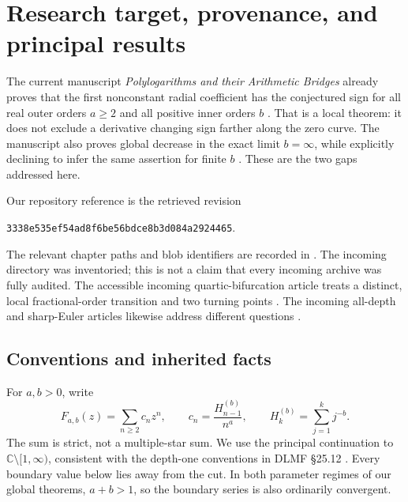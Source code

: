 \documentclass[11pt,letterpaper]{article}
\numberwithin{equation}{section}
\theoremstyle{definition}
\theoremstyle{remark}
\newcommand{\C}{\mathbb C}
\newcommand{\cut}{\C\setminus[1,\infty)}
\begin{document}
\section{Research target, provenance, and principal results}
\label{sec:overview}
The current manuscript \emph{Polylogarithms and their Arithmetic Bridges}
already proves that the first nonconstant radial coefficient has the
conjectured sign for all real outer orders $a\ge2$ and all positive
inner orders $b$ \cite{repo-local}. That is a local theorem: it does not
exclude a derivative changing sign farther along the zero curve.
The manuscript also proves global decrease in the exact limit
$b=\infty$, while explicitly declining to infer the same assertion for
finite $b$ \cite{repo-cartesian}. These are the two gaps addressed here.

Our repository reference is the retrieved revision
\begin{center}
\small\texttt{3338e535ef54ad8f6be56bdce8b3d084a2924465}.
\end{center}
The relevant chapter paths and blob identifiers are recorded in
. The incoming directory was inventoried;
this is not a claim that every incoming archive was fully audited.
The accessible incoming quartic-bifurcation article treats a distinct,
local fractional-order transition and two turning points
\cite{incoming-bifurcation}. The incoming all-depth and sharp-Euler
articles likewise address different questions
\cite{incoming-oscillation,incoming-euler}.

\subsection{Conventions and inherited facts}
For $a,b>0$, write
\begin{equation}\label{eq:def}
 F_{a,b}(z)=\sum_{n\ge2}c_nz^n,
 \qquad c_n=\frac{H_{n-1}^{(b)}}{n^a},
 \qquad H_k^{(b)}=\sum_{j=1}^k j^{-b}.
\end{equation}
The sum is strict, not a multiple-star sum. We use the principal
continuation to $\cut$, consistent with the depth-one conventions in
DLMF \S25.12 \cite{dlmf-polylog}. Every boundary value below lies away
from the cut. In both parameter regimes of our global theorems,
$a+b>1$, so the boundary series is also ordinarily convergent.
\end{document}
